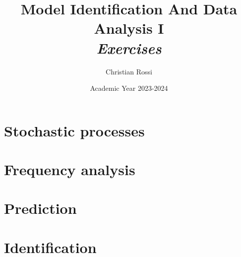 \documentclass[12pt, a4paper]{report}
\title{Model Identification And Data Analysis I \\ \textit{Exercises}}
\author{Christian Rossi}
\date{Academic Year 2023-2024}
\begin{document}
    \maketitle

    

    \cleardoublepage{}

    \tableofcontents

    \cleardoublepage{}

    \chapter{Stochastic processes}
    
    
    
    
    
    
    
    
    

    \chapter{Frequency analysis}
    
    
    
    

    \chapter{Prediction}
    
    
    
    
    
    

    \chapter{Identification}
    
    
    
    
    
    
    
    
    
    
    
\end{document}
